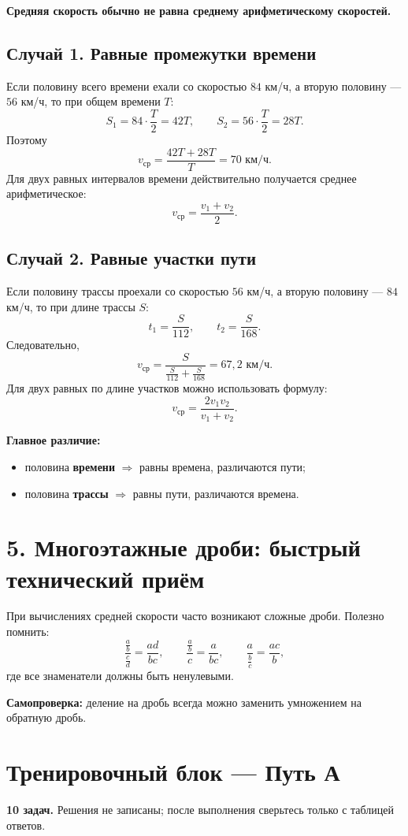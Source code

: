 \documentclass[a4paper,12pt]{article}
\begin{document}
\textbf{Средняя скорость обычно не равна среднему арифметическому скоростей.}

\subsection*{Случай 1. Равные промежутки времени}
Если половину всего времени ехали со скоростью \(84\) км/ч, а вторую половину — \(56\) км/ч, то при общем времени \(T\):
\[
S_1=84\cdot\frac{T}{2}=42T,
\qquad
S_2=56\cdot\frac{T}{2}=28T.
\]
Поэтому
\[
v_{\text{ср}}=\frac{42T+28T}{T}=\boxed{70\text{ км/ч}}.
\]
Для двух равных интервалов времени действительно получается среднее арифметическое:
\[
v_{\text{ср}}=\frac{v_1+v_2}{2}.
\]

\subsection*{Случай 2. Равные участки пути}
Если половину трассы проехали со скоростью \(56\) км/ч, а вторую половину — \(84\) км/ч, то при длине трассы \(S\):
\[
t_1=\frac{S}{112},
\qquad
t_2=\frac{S}{168}.
\]
Следовательно,
\[
v_{\text{ср}}=
\frac{S}{\frac{S}{112}+\frac{S}{168}}
=\boxed{67{,}2\text{ км/ч}}.
\]
Для двух равных по длине участков можно использовать формулу:
\[
\boxed{v_{\text{ср}}=\frac{2v_1v_2}{v_1+v_2}}.
\]

\textbf{Главное различие:}
\begin{itemize}
  \item половина \textbf{времени} \(\Rightarrow\) равны времена, различаются пути;
  \item половина \textbf{трассы} \(\Rightarrow\) равны пути, различаются времена.
\end{itemize}

\section*{5. Многоэтажные дроби: быстрый технический приём}

При вычислениях средней скорости часто возникают сложные дроби. Полезно помнить:
\[
\frac{\frac{a}{b}}{\frac{c}{d}}=\frac{ad}{bc},
\qquad
\frac{\frac{a}{b}}{c}=\frac{a}{bc},
\qquad
\frac{a}{\frac{b}{c}}=\frac{ac}{b},
\]
где все знаменатели должны быть ненулевыми.

\textbf{Самопроверка:} деление на дробь всегда можно заменить умножением на обратную дробь.

\clearpage
\section*{Тренировочный блок — Путь А}
\textbf{10 задач.} Решения не записаны; после выполнения сверьтесь только с таблицей ответов.
\end{document}
